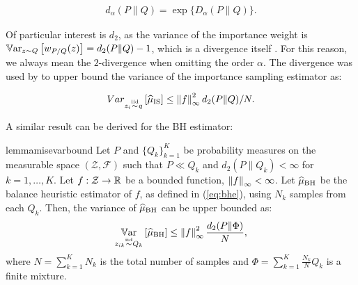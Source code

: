 \begin{align}
d_{\alpha}(P\|Q) = \exp\{D_{\alpha}(P\|Q)\}.
\end{align}

Of particular interest is $d_2$, as the variance of the importance weight is $\Var_{z\sim Q}\left[w_{P/Q}(z)\right] = d_2(P\|Q) - 1$, which is a divergence itself \cite{cortes2010learning}. For this reason, we always mean the $2$-\Renyi divergence when omitting the order $\alpha$. The \Renyi divergence was used by \cite{metelli2018policy} to upper bound the variance of the importance sampling estimator as:

\begin{align}
Var_{z_i\simiid q}\left[\wh{\mu}_{\text{IS}}\right]\leq \norm[\infty]{f}^2d_2(P\|Q)/N.
\end{align}

A similar result can be derived for the BH estimator:
\begin{restatable}{lemma}{misevarbound}\label{lem:misevarbound}
	Let $P$ and $\{ Q_k \}_{k=1}^K$ be probability measures on the measurable space $(\mathcal{Z},\mathcal{F})$ such that $P\ll Q_k$ and $d_2(P\|Q_k)<\infty$ for $k=1,\dots,K$. Let $f:\mathcal{Z}\to\Reals$ be a bounded function, \ie $\norm[\infty]{f}<\infty$. Let $\wh{\mu}_{\text{BH}}$ be the balance heuristic estimator of $f$, as defined in (\ref{eq:bhe}), using $N_k$ \iid samples from each $Q_k$. Then, the variance of $\wh{\mu}_{\text{BH}}$ can be upper bounded as:
	\begin{align}
		\Var_{z_{ik}\simiid Q_k}\left[\wh{\mu}_{\text{BH}}\right] \leq \norm[\infty]{f}^2\frac{d_2(P\|\Phi)}{N},
	\end{align}
	where ${N=\sum_{k=1}^{K}N_k}$ is the total number of samples and ${\Phi=\sum_{k=1}^K\frac{N_k}{N}Q_k}$ is a finite mixture.
\end{restatable}
%

